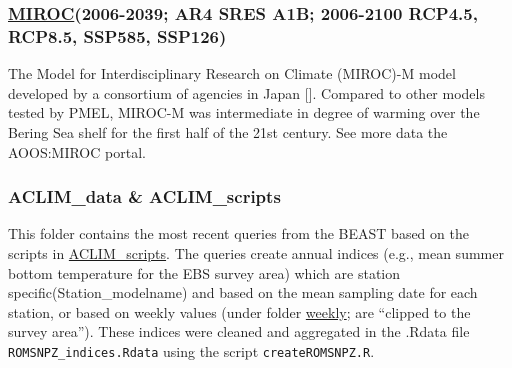 \documentclass[
]{article}
\begin{document}
\hypertarget{miroc2006-2039-ar4-sres-a1b-2006-2100-rcp4.5-rcp8.5-ssp585-ssp126}{%
\subsubsection{\texorpdfstring{\href{www.cger.nies.go.jp/publications/report/i073/I073.pdf}{MIROC}(2006-2039;
AR4 SRES A1B; 2006-2100 RCP4.5, RCP8.5, SSP585,
SSP126)}{MIROC(2006-2039; AR4 SRES A1B; 2006-2100 RCP4.5, RCP8.5, SSP585, SSP126)}}\label{miroc2006-2039-ar4-sres-a1b-2006-2100-rcp4.5-rcp8.5-ssp585-ssp126}}

The Model for Interdisciplinary Research on Climate (MIROC)-M model
developed by a consortium of agencies in Japan {[}{]}. Compared to other
models tested by PMEL, MIROC-M was intermediate in degree of warming
over the Bering Sea shelf for the first half of the 21st century. See
more data the AOOS:MIROC portal.

\hypertarget{aclim_data-aclim_scripts}{%
\subsubsection{ACLIM\_data \&
ACLIM\_scripts}\label{aclim_data-aclim_scripts}}

This folder contains the most recent queries from the BEAST based on the
scripts in
\href{\%22https://github.com/kholsman/ACLIM/ACLIM_scripts\%22}{ACLIM\_scripts}.
The queries create annual indices (e.g., mean summer bottom temperature
for the EBS survey area) which are station specific(Station\_modelname)
and based on the mean sampling date for each station, or based on weekly
values (under folder
\href{\%22https://github.com/kholsman/ACLIM/ACLIM_data/ROMS_NPZ_queries/weekly\%22}{weekly};
are ``clipped to the survey area''). These indices were cleaned and
aggregated in the .Rdata file \texttt{ROMSNPZ\_indices.Rdata} using the
script \texttt{createROMSNPZ.R}.
\end{document}

